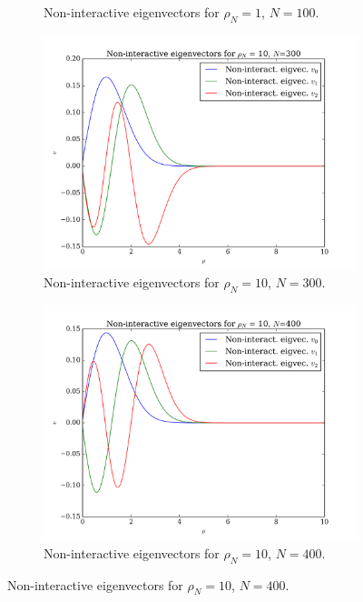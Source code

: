 \documentclass[11pt,a4paper,notitlepage]{article}
\begin{document}
\begin{figure}[H]
\begin{subfigure}[t]{0.45\textwidth}
        \caption{Non-interactive eigenvectors for $\rho_N = 1$, $N = 100$.}\label{fig:eigvecs-non-interact-1-100}
    \end{subfigure}
    \begin{subfigure}[b]{0.45\textwidth}
        \includegraphics[scale=0.40]{../non_interacting_eigvec_plot_rhoN=10_N=300.png}
        \caption{Non-interactive eigenvectors for $\rho_N = 10$, $N = 300$.}\label{fig:eigvecs-non-interact-10-300}
    \end{subfigure}
    \hfill
    \begin{subfigure}[b]{0.45\textwidth}
        \includegraphics[scale=0.40]{../non_interacting_eigvec_plot_rhoN=10_N=400.png}
        \caption{Non-interactive eigenvectors for $\rho_N = 10$, $N = 400$.}\label{fig:eigvecs-non-interact-10-400}

\end{subfigure}
\end{figure}
\end{document}

